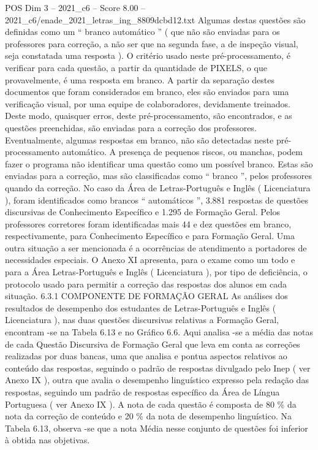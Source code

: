 \begin{textsample}{POS Dim 3 – 2021\_c6 – Score 8.00 – 2021\_c6/enade\_2021\_letras\_ing\_8809dcbd12.txt}
Algumas destas questões são definidas como um “ branco automático ” ( que não são enviadas para os professores para correção, a não ser que na segunda fase, a de inspeção visual, seja constatada uma resposta ).
O critério usado neste pré-processamento, é verificar para cada questão, a partir da quantidade de PIXELS, o que provavelmente, é uma resposta em branco.
A partir da separação destes documentos que foram considerados em branco, eles são enviados para uma verificação visual, por uma equipe de colaboradores, devidamente treinados.
Deste modo, quaisquer erros, deste pré-processamento, são encontrados, e as questões preenchidas, são enviadas para a correção dos professores.
Eventualmente, algumas respostas em branco, não são detectadas neste pré-processamento automático.
A presença de pequenos riscos, ou manchas, podem fazer o programa não identificar uma questão como um possível branco.
Estas são enviadas para a correção, mas são classificadas como “ branco ”, pelos professores quando da correção.
No caso da Área de Letras-Português e Inglês ( Licenciatura ), foram identificados como brancos “ automáticos ”, 3.881 respostas de questões discursivas de Conhecimento Específico e 1.295 de Formação Geral.
Pelos professores corretores foram identificadas mais 44 e dez questões em branco, respectivamente, para Conhecimento Específico e para Formação Geral.
Uma outra situação a ser mencionada é a ocorrências de atendimento a portadores de necessidades especiais.
O Anexo XI apresenta, para o exame como um todo e para a Área Letras-Português e Inglês ( Licenciatura ), por tipo de deficiência, o protocolo usado para permitir a correção das respostas dos alunos em cada situação. 6.3.1 COMPONENTE DE FORMAÇÃO GERAL As análises dos resultados de desempenho dos estudantes de Letras-Português e Inglês ( Licenciatura ), nas duas questões discursivas relativas a Formação Geral, encontram -se na Tabela 6.13 e no Gráfico 6.6.
Aqui analisa -se a média das notas de cada Questão Discursiva de Formação Geral que leva em conta as correções realizadas por duas bancas, uma que analisa e pontua aspectos relativos ao conteúdo das respostas, seguindo o padrão de respostas divulgado pelo Inep ( ver Anexo IX ), outra que avalia o desempenho linguístico expresso pela redação das respostas, seguindo um padrão de respostas específico da Área de Língua Portuguesa ( ver Anexo IX ).
A nota de cada questão é composta de 80 \% da nota da correção de conteúdo e 20 \% da nota de desempenho linguístico.
Na Tabela 6.13, observa -se que a nota Média nesse conjunto de questões foi inferior à obtida nas objetivas.

\end{textsample}
